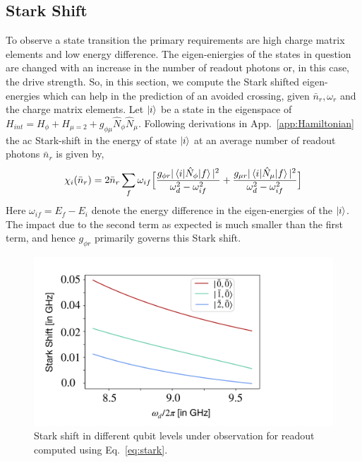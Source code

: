 \documentclass[%
reprint,
superscriptaddress,
 amsmath,amssymb,
 aps,
 prx,
longbibliography,
floatfix,
]{revtex4-2}
\begin{document}
\subsection{Stark Shift}\label{app:stark-shift}
To observe a state transition the primary requirements are high charge matrix elements and low energy difference. The eigen-eniergies of the states in question are changed with an increase in the number of readout photons or, in this case, the drive strength. So, in this section, we compute the Stark shifted eigen-energies which can help in the prediction of an avoided crossing, given $\bar n_r, \omega_r$ and the charge matrix elements.  Let $\ket{i}$ be a state in the eigenspace of $H_{int}=H_\phi+H_{\mu=2}+g_{\phi\mu}\hat N_\phi\hat N_\mu$. Following derivations in App.~\ref{app:Hamiltonian} the ac Stark-shift in the energy of state $\ket{i}$ at an average number of readout photons $\bar n_r$ is given by,
\begin{align}
    \chi_i(\bar n_r)=2\bar n_r\sum_{f}\omega_{if}\Big[\frac{g_{\phi r}|\braket{i|\hat N_\phi|f}|^2}{\omega_d^2-\omega_{if}^2}+\frac{g_{\mu r}|\braket{i|\hat N_\mu|f}|^2}{\omega_d^2-\omega_{if}^2}\Big]\label{eq:stark}
\end{align}
 Here $\omega_{if}=E_f-E_i$ denote the energy difference in the eigen-energies of the $\ket{i}$. The impact due to the second term as expected is much smaller than the first term, and hence $g_{\phi r}$ primarily governs this Stark shift.
 \begin{figure}
     \centering
     \includegraphics[width=\linewidth]{Figures/Stark-shift.pdf}
     \caption{Stark shift in different qubit levels under observation for readout computed using Eq.~\ref{eq:stark}.}
     \label{fig:stark-shift}
 \end{figure}
\end{document}
